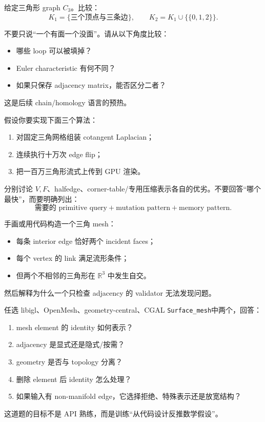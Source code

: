 \documentclass[UTF8,11pt]{ctexart}
\newcommand{\cgalSurfaceMesh}{\texttt{Surface\_mesh}}
\begin{document}
\begin{exercise}
给定三角形 graph $C_3$。比较：
\[
K_1=\{\text{三个顶点与三条边}\},
\qquad
K_2=K_1\cup\{\{0,1,2\}\}.
\]

不要只说“一个有面一个没面”。请从以下角度比较：
\begin{itemize}
  \item 哪些 loop 可以被填掉？
  \item Euler characteristic 有何不同？
  \item 如果只保存 adjacency matrix，能否区分二者？
\end{itemize}

这是后续 chain/homology 语言的预热。
\end{exercise}

\begin{exercise}
假设你要实现下面三个算法：

\begin{enumerate}
  \item 对固定三角网格组装 cotangent Laplacian；
  \item 连续执行十万次 edge flip；
  \item 把一百万三角形流式上传到 GPU 渲染。
\end{enumerate}

分别讨论 $V,F$、halfedge、corner-table/专用压缩表示各自的优劣。不要回答“哪个最快”，而要明确列出：
\[
\text{需要的 primitive query} + \text{mutation pattern} + \text{memory pattern}.
\]
\end{exercise}

\begin{exercise}
手画或用代码构造一个三角 mesh：

\begin{itemize}
  \item 每条 interior edge 恰好两个 incident faces；
  \item 每个 vertex 的 link 满足流形条件；
  \item 但两个不相邻的三角形在 $\mathbb R^3$ 中发生自交。
\end{itemize}

然后解释为什么一个只检查 adjacency 的 validator 无法发现问题。
\end{exercise}

\begin{exercise}[5：读库，不写代码]
任选 libigl、OpenMesh、geometry-central、CGAL \cgalSurfaceMesh 中两个，回答：

\begin{enumerate}
  \item mesh element 的 identity 如何表示？
  \item adjacency 是显式还是隐式/按需？
  \item geometry 是否与 topology 分离？
  \item 删除 element 后 identity 怎么处理？
  \item 如果输入有 non-manifold edge，它选择拒绝、特殊表示还是放宽结构？
\end{enumerate}

这道题的目标不是 API 熟练，而是训练“从代码设计反推数学假设”。
\end{exercise}
\end{document}
